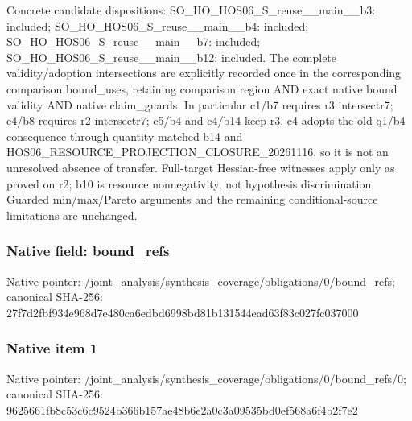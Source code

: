 \documentclass[10pt,a4paper]{article}
\begin{document}
\begingroup\raggedright\sloppy Concrete candidate dispositions:\allowbreak{} SO\_\allowbreak{}HO\_\allowbreak{}HOS06\_\allowbreak{}S\_\allowbreak{}reuse\_\allowbreak{}\_\allowbreak{}main\_\allowbreak{}\_\allowbreak{}b3:\allowbreak{} included;\allowbreak{} SO\_\allowbreak{}HO\_\allowbreak{}HOS06\_\allowbreak{}S\_\allowbreak{}reuse\_\allowbreak{}\_\allowbreak{}main\_\allowbreak{}\_\allowbreak{}b4:\allowbreak{} included;\allowbreak{} SO\_\allowbreak{}HO\_\allowbreak{}HOS06\_\allowbreak{}S\_\allowbreak{}reuse\_\allowbreak{}\_\allowbreak{}main\_\allowbreak{}\_\allowbreak{}b7:\allowbreak{} included;\allowbreak{} SO\_\allowbreak{}HO\_\allowbreak{}HOS06\_\allowbreak{}S\_\allowbreak{}reuse\_\allowbreak{}\_\allowbreak{}main\_\allowbreak{}\_\allowbreak{}b12:\allowbreak{} included. The complete validity/\allowbreak{}adoption intersections are explicitly recorded once in the corresponding comparison bound\_\allowbreak{}uses,\allowbreak{} retaining comparison region AND exact native bound validity AND native claim\_\allowbreak{}guards. In particular c1/\allowbreak{}b7 requires r3 intersectr7;\allowbreak{} c4/\allowbreak{}b8 requires r2 intersectr7;\allowbreak{} c5/\allowbreak{}b4 and c4/\allowbreak{}b14 keep r3. c4 adopts the old q1/\allowbreak{}b4 consequence through quantity-matched b14 and HOS06\_\allowbreak{}RESOURCE\_\allowbreak{}PROJECTION\_\allowbreak{}CLOSURE\_\allowbreak{}20261116,\allowbreak{} so it is not an unresolved absence of transfer. Full-target Hessian-free witnesses apply only as proved on r2;\allowbreak{} b10 is resource nonnegativity,\allowbreak{} not hypothesis discrimination. Guarded min/\allowbreak{}max/\allowbreak{}Pareto arguments and the remaining conditional-source limitations are unchanged.\par\endgroup

\subsubsection{Native field: bound\_\allowbreak{}refs}
Native pointer: /joint\_\allowbreak{}analysis/synthesis\_\allowbreak{}coverage/obligations/0/bound\_\allowbreak{}refs; canonical SHA-256: 27f7d2fbf934e968d7e480ca6edbd6998bd81b131544ead63f83c027fc037000

\subsubsection{Native item 1}
Native pointer: /joint\_\allowbreak{}analysis/synthesis\_\allowbreak{}coverage/obligations/0/bound\_\allowbreak{}refs/0; canonical SHA-256: 9625661fb8c53c6c9524b366b157ae48b6e2a0c3a09535bd0ef568a6f4b2f7e2
\end{document}

